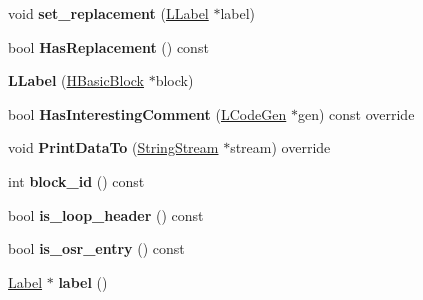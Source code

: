 \begin{DoxyCompactItemize}
\item 
void {\bfseries set\+\_\+replacement} (\hyperlink{classv8_1_1internal_1_1_l_label}{L\+Label} $\ast$label)\hypertarget{classv8_1_1internal_1_1_l_label_a05875ed6601582974b107974f2720dc6}{}\label{classv8_1_1internal_1_1_l_label_a05875ed6601582974b107974f2720dc6}

\item 
bool {\bfseries Has\+Replacement} () const \hypertarget{classv8_1_1internal_1_1_l_label_a3215ec5382dd576d965f7ff0e18a7b0e}{}\label{classv8_1_1internal_1_1_l_label_a3215ec5382dd576d965f7ff0e18a7b0e}

\item 
{\bfseries L\+Label} (\hyperlink{classv8_1_1internal_1_1_h_basic_block}{H\+Basic\+Block} $\ast$block)\hypertarget{classv8_1_1internal_1_1_l_label_aa8ea13a89f3934f66742778ba3f83cd4}{}\label{classv8_1_1internal_1_1_l_label_aa8ea13a89f3934f66742778ba3f83cd4}

\item 
bool {\bfseries Has\+Interesting\+Comment} (\hyperlink{classv8_1_1internal_1_1_l_code_gen}{L\+Code\+Gen} $\ast$gen) const  override\hypertarget{classv8_1_1internal_1_1_l_label_aa0a8236af4aaa8c0433e5082df86d31a}{}\label{classv8_1_1internal_1_1_l_label_aa0a8236af4aaa8c0433e5082df86d31a}

\item 
void {\bfseries Print\+Data\+To} (\hyperlink{classv8_1_1internal_1_1_string_stream}{String\+Stream} $\ast$stream) override\hypertarget{classv8_1_1internal_1_1_l_label_ac1318b8f414140c11ee85e3acd00491f}{}\label{classv8_1_1internal_1_1_l_label_ac1318b8f414140c11ee85e3acd00491f}

\item 
int {\bfseries block\+\_\+id} () const \hypertarget{classv8_1_1internal_1_1_l_label_a87739f07ada487049bd402d117ea0bdc}{}\label{classv8_1_1internal_1_1_l_label_a87739f07ada487049bd402d117ea0bdc}

\item 
bool {\bfseries is\+\_\+loop\+\_\+header} () const \hypertarget{classv8_1_1internal_1_1_l_label_a310f97c551f5ab43f42ef04d2b97b349}{}\label{classv8_1_1internal_1_1_l_label_a310f97c551f5ab43f42ef04d2b97b349}

\item 
bool {\bfseries is\+\_\+osr\+\_\+entry} () const \hypertarget{classv8_1_1internal_1_1_l_label_a2a98f2b24dada94a6a1e4f78b0cb88be}{}\label{classv8_1_1internal_1_1_l_label_a2a98f2b24dada94a6a1e4f78b0cb88be}

\item 
\hyperlink{classv8_1_1internal_1_1_label}{Label} $\ast$ {\bfseries label} ()\hypertarget{classv8_1_1internal_1_1_l_label_aad0d2d6e266d7d6ee11d0d4d2e4342c8}{}\label{classv8_1_1internal_1_1_l_label_aad0d2d6e266d7d6ee11d0d4d2e4342c8}


\end{DoxyCompactItemize}
